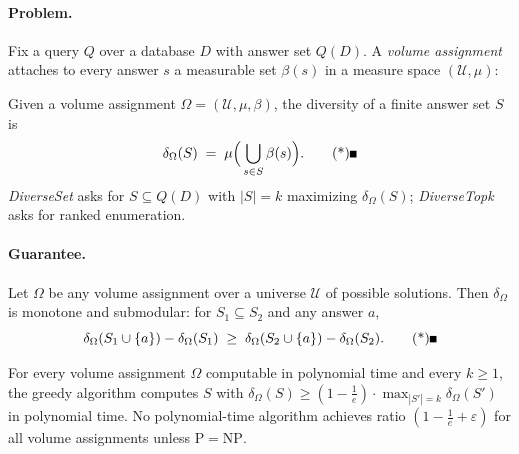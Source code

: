 \paragraph{Problem.}
Fix a query $Q$ over a database $D$ with answer set $Q(D)$. A \emph{volume assignment}
attaches to every answer $s$ a measurable set $\beta(s)$ in a measure space
$(\mathcal{U}, \mu)$:

\begin{definition}\label{def:red-volume}
Given a volume assignment $\Omega = (\mathcal{U}, \mu, \beta)$, the diversity of a
finite answer set $S$ is
\[
\delta_\Omega(S) \;=\; \mu\Bigl(\, \bigcup_{s \in S} \beta(s) \Bigr). \eopm
\]
\emph{DiverseSet} asks for $S \subseteq Q(D)$ with $|S| = k$ maximizing
$\delta_\Omega(S)$; \emph{DiverseTopk} asks for ranked enumeration.
\end{definition}

\paragraph{Guarantee.}

\begin{proposition}\label{prop:red-submod}
Let $\Omega$ be any volume assignment over a universe $\mathcal{U}$ of possible
solutions. Then $\delta_\Omega$ is monotone and submodular: for
$S_1 \subseteq S_2$ and any answer $a$,
\[
\delta_\Omega(S_1 \cup \{a\}) - \delta_\Omega(S_1) \;\ge\;
\delta_\Omega(S_2 \cup \{a\}) - \delta_\Omega(S_2). \eopm
\]
\end{proposition}

\begin{corollary}\label{cor:red-greedy}
For every volume assignment $\Omega$ computable in polynomial time and every $k \ge 1$,
the greedy algorithm computes $S$ with $\delta_\Omega(S) \ge (1 - \tfrac{1}{e}) \cdot
\max_{|S'| = k} \delta_\Omega(S')$ in polynomial time. No polynomial-time algorithm
achieves ratio $(1 - \tfrac{1}{e} + \varepsilon)$ for all volume assignments unless
$\mathrm{P} = \mathrm{NP}$. \eop
\end{corollary}

